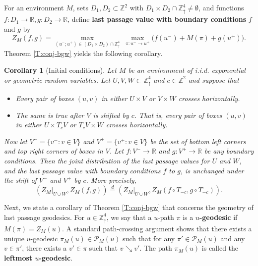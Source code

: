 \documentclass[aop, preprint]{imsart}
\theoremstyle{plain}
\newtheorem{corollary}[theorem]{Corollary}
\theoremstyle{definition}
\theoremstyle{plain}
\newcommand{\sset}{\subset}
\newcommand{\Zd}{\mathds{Z}^4_\uparrow}
\newcommand{\scrP}{\mathcal{P}}
\newcommand{\Z}{\mathds{Z}}
\newcommand{\R}{\mathds{R}}
\newcommand{\eqd}{\stackrel{d}{=}}
\newcommand{\X}{\times}
\begin{document}
For an environment $M$, sets $D_1, D_2 \sset \Z^2$ with $D_1\X D_2 \cap \Zd \ne \emptyset$, and functions $f:D_1 \to \R, g:D_2 \to \R$, define \textbf{last passage value with boundary conditions} $f$ and $g$ by
$$
Z_M(f, g) = \max_{(u^-; u^+) \in (D_1\X D_2) \cap \Zd} \; \max_{\pi:u^- \to u^+} \big( f(u^-) + M(\pi) +g(u^+) \big).
$$
Theorem \ref{T:conj-bgw} yields the following corollary.

\begin{corollary} [Initial conditions]
	\label{C:conj-bgw-init} 
	Let $M$ be an environment of i.i.d. exponential or geometric random variables. Let $U, V, W \sset \Zd$ and $c \in \Z^2$ and suppose that 
	\begin{itemize}
		\item Every pair of boxes $(u, v)$ in either $U \X V$ or $V \X W$ crosses horizontally.
		\item The same is true after $V$ is shifted by $c$. That is, every pair of boxes $(u, v)$ in either $U \X T_cV$ or $T_cV \X W$ crosses horizontally.
	\end{itemize}
	Now let $V^- = \{v^- : v \in V\}$ and $V^+ = \{v^+ : v \in V\}$ be the set of bottom left corners and top right corners of boxes in $V$. Let $f:V^- \to \R$ and $g:V^+ \to \R$ be any boundary conditions.
	Then the joint distribution of the last passage values for $U$ and $W$, and the last passage value with boundary conditions $f$ to $g$, is unchanged under the shift of $V^-$ and $V^+$ by $c$. More precisely,
	$$
	(Z_M|_{U \cup W}, Z_M(f, g)) \eqd (Z_M|_{U \cup W}, Z_M(f \circ T_{-c}, g \circ T_{-c})).
	$$
\end{corollary}

Next, we state a corollary of Theorem \ref{T:conj-bgw} that concerns the geometry of last passage geodesics. For $u  \in \Zd$, we say that a $u$-path $\pi$ is a \textbf{$u$-geodesic} if $M(\pi) = Z_M(u)$. A standard path-crossing argument shows that there exists a unique $u$-geodesic $\pi_M(u) \in \scrP_M(u)$ such that for any $\pi' \in \scrP_M(u)$ and any $v \in \pi'$, there exists a $v' \in \pi$ such that $v \searrow v'$. The path $\pi_M(u)$ is called the \textbf{leftmost $u$-geodesic}.
\end{document}
